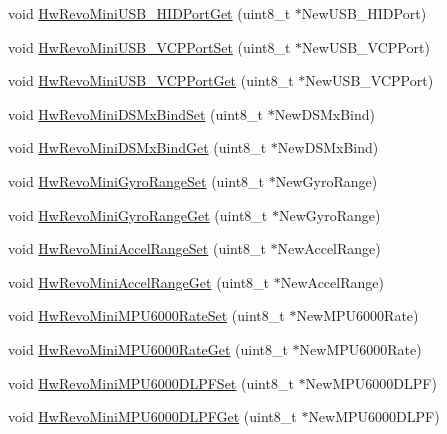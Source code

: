 \begin{DoxyCompactItemize}
\item 
void \hyperlink{group___hw_revo_mini_gae1e9c67fbd59db37ac60051fe7a3eb7d}{\-Hw\-Revo\-Mini\-U\-S\-B\-\_\-\-H\-I\-D\-Port\-Get} (uint8\-\_\-t $\ast$\-New\-U\-S\-B\-\_\-\-H\-I\-D\-Port)
\item 
void \hyperlink{group___hw_revo_mini_ga834e2220b02f03ce2facd10632b7eba7}{\-Hw\-Revo\-Mini\-U\-S\-B\-\_\-\-V\-C\-P\-Port\-Set} (uint8\-\_\-t $\ast$\-New\-U\-S\-B\-\_\-\-V\-C\-P\-Port)
\item 
void \hyperlink{group___hw_revo_mini_gabf9276831e8e1bd266249ee00d4927c4}{\-Hw\-Revo\-Mini\-U\-S\-B\-\_\-\-V\-C\-P\-Port\-Get} (uint8\-\_\-t $\ast$\-New\-U\-S\-B\-\_\-\-V\-C\-P\-Port)
\item 
void \hyperlink{group___hw_revo_mini_ga4a05e72fc91bed66512e4efbab070b27}{\-Hw\-Revo\-Mini\-D\-S\-Mx\-Bind\-Set} (uint8\-\_\-t $\ast$\-New\-D\-S\-Mx\-Bind)
\item 
void \hyperlink{group___hw_revo_mini_gaa24d7636118fb3cc11b5f3c83a1ea221}{\-Hw\-Revo\-Mini\-D\-S\-Mx\-Bind\-Get} (uint8\-\_\-t $\ast$\-New\-D\-S\-Mx\-Bind)
\item 
void \hyperlink{group___hw_revo_mini_ga88eb70304edbd510f581d0ae35ed094a}{\-Hw\-Revo\-Mini\-Gyro\-Range\-Set} (uint8\-\_\-t $\ast$\-New\-Gyro\-Range)
\item 
void \hyperlink{group___hw_revo_mini_gaf51ab822e27c2596ba5d93ecd9de18a0}{\-Hw\-Revo\-Mini\-Gyro\-Range\-Get} (uint8\-\_\-t $\ast$\-New\-Gyro\-Range)
\item 
void \hyperlink{group___hw_revo_mini_ga2330f96f5a8412052f3167609c7c9cdc}{\-Hw\-Revo\-Mini\-Accel\-Range\-Set} (uint8\-\_\-t $\ast$\-New\-Accel\-Range)
\item 
void \hyperlink{group___hw_revo_mini_ga3f844d31238275af13c0d70291b5a2bf}{\-Hw\-Revo\-Mini\-Accel\-Range\-Get} (uint8\-\_\-t $\ast$\-New\-Accel\-Range)
\item 
void \hyperlink{group___hw_revo_mini_gaacb79f5b9c12e3ac9a7c79286f412663}{\-Hw\-Revo\-Mini\-M\-P\-U6000\-Rate\-Set} (uint8\-\_\-t $\ast$\-New\-M\-P\-U6000\-Rate)
\item 
void \hyperlink{group___hw_revo_mini_gaef93d00086b62e2dbe15543acc20ac25}{\-Hw\-Revo\-Mini\-M\-P\-U6000\-Rate\-Get} (uint8\-\_\-t $\ast$\-New\-M\-P\-U6000\-Rate)
\item 
void \hyperlink{group___hw_revo_mini_gabb4de7632f616819e137dcb1ac89547e}{\-Hw\-Revo\-Mini\-M\-P\-U6000\-D\-L\-P\-F\-Set} (uint8\-\_\-t $\ast$\-New\-M\-P\-U6000\-D\-L\-P\-F)
\item 
void \hyperlink{group___hw_revo_mini_ga37a8c36b5ff64ee91c8d9c8416b0403e}{\-Hw\-Revo\-Mini\-M\-P\-U6000\-D\-L\-P\-F\-Get} (uint8\-\_\-t $\ast$\-New\-M\-P\-U6000\-D\-L\-P\-F)
\end{DoxyCompactItemize}


